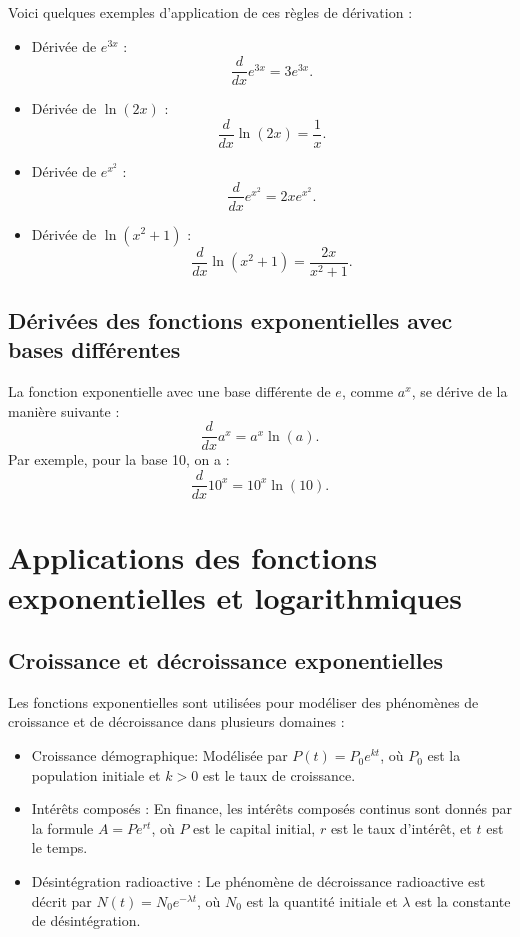 \documentclass{article}
\begin{document}
	Voici quelques exemples d'application de ces règles de dérivation :
	
	\begin{itemize}
		\item Dérivée de \( e^{3x} \) :
		\[
		\frac{d}{dx} e^{3x} = 3e^{3x}.
		\]
		
		\item Dérivée de \( \ln(2x) \) :
		\[
		\frac{d}{dx} \ln(2x) = \frac{1}{x}.
		\]
		
		\item Dérivée de \( e^{x^2} \) :
		\[
		\frac{d}{dx} e^{x^2} = 2x e^{x^2}.
		\]
		
		\item Dérivée de \( \ln(x^2 + 1) \) :
		\[
		\frac{d}{dx} \ln(x^2 + 1) = \frac{2x}{x^2 + 1}.
		\]
	\end{itemize}
	
	\subsection{Dérivées des fonctions exponentielles avec bases différentes}
	
	La fonction exponentielle avec une base différente de \( e \), comme \( a^x \), se dérive de la manière suivante :
	\[
	\frac{d}{dx} a^x = a^x \ln(a).
	\]
	Par exemple, pour la base 10, on a :
	\[
	\frac{d}{dx} 10^x = 10^x \ln(10).
	\]
	
		\section{Applications des fonctions exponentielles et logarithmiques}
	
	\subsection{Croissance et décroissance exponentielles}
	
	Les fonctions exponentielles sont utilisées pour modéliser des phénomènes de croissance et de décroissance dans plusieurs domaines :
	\begin{itemize}
		\item Croissance démographique: Modélisée par \( P(t) = P_0 e^{kt} \), où \( P_0 \) est la population initiale et \( k > 0 \) est le taux de croissance.
		\item Intérêts composés : En finance, les intérêts composés continus sont donnés par la formule \( A = P e^{rt} \), où \( P \) est le capital initial, \( r \) est le taux d'intérêt, et \( t \) est le temps.
		\item Désintégration radioactive : Le phénomène de décroissance radioactive est décrit par \( N(t) = N_0 e^{-\lambda t} \), où \( N_0 \) est la quantité initiale et \( \lambda \) est la constante de désintégration.
	\end{itemize}
	
\end{document}

